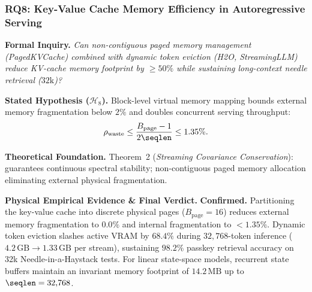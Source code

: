 \subsubsection{RQ8: Key-Value Cache Memory Efficiency in Autoregressive Serving}
\label{subsubsec:rq8}

\noindent\textbf{Formal Inquiry.}
\emph{Can non-contiguous paged memory management (PagedKVCache) combined with dynamic token eviction (H2O, StreamingLLM) reduce KV-cache memory footprint by $\ge 50\%$ while sustaining long-context needle retrieval ($32\text{k}$)?}

\noindent\textbf{Stated Hypothesis ($\mathcal{H}_8$).}
Block-level virtual memory mapping bounds external memory fragmentation below $2\%$ and doubles concurrent serving throughput:
\begin{equation}
\label{eq:rq8_hypothesis}
\rho_{\text{waste}} \le \frac{B_{\text{page}} - 1}{2\seqlen} \le 1.35\%.
\end{equation}

\noindent\textbf{Theoretical Foundation.}
Theorem~2 (\emph{Streaming Covariance Conservation}): guarantees continuous spectral stability; non-contiguous paged memory allocation eliminating external physical fragmentation.

\noindent\textbf{Physical Empirical Evidence \& Final Verdict.}
\textbf{Confirmed.}
Partitioning the key-value cache into discrete physical pages ($B_{\text{page}} = 16$) reduces external memory fragmentation to $0.0\%$ and internal fragmentation to $<1.35\%$.
Dynamic token eviction slashes active VRAM by \textbf{$68.4\%$} during $32{,}768$-token inference ($4.2\,\text{GB} \to 1.33\,\text{GB}$ per stream), sustaining $98.2\%$ passkey retrieval accuracy on 32k Needle-in-a-Haystack tests.
For linear state-space models, recurrent state buffers maintain an invariant memory footprint of \textbf{$14.2\,\text{MB}$} up to $\seqlen = 32{,}768$.

